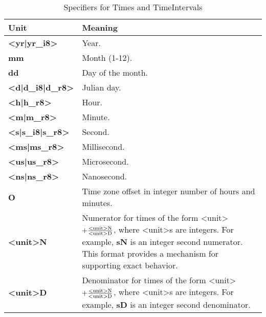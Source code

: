 \newpage
\begin{center}
\begin{table}
\caption{\label{table:timeOpts}Specifiers for Times and TimeIntervals}
\begin{tabular}{|p{1in}|p{3.5in}|}
\hline
Unit & Meaning \\
\hline\hline
{\bf <yr|yr\_i8>} & Year. \\
\hline
{\bf mm} & Month (1-12). \\
\hline
{\bf dd} & Day of the month. \\
\hline
{\bf <d|d\_i8|d\_r8>} & Julian day. \\
\hline
{\bf <h|h\_r8>} & Hour. \\
\hline
{\bf <m|m\_r8>} & Minute. \\
\hline
{\bf <s|s\_i8|s\_r8>} & Second. \\
\hline
{\bf <ms|ms\_r8>} & Millisecond. \\
\hline
{\bf <us|us\_r8>} & Microsecond. \\
\hline
{\bf <ns|ns\_r8>} & Nanosecond. \\
\hline
{\bf O} & Time zone offset in integer number of hours and minutes. \\
\hline
{\bf <unit>N} & Numerator for times of the form <unit> {\bf $ + 
\frac{{\rm <unit>N}}{{\rm <unit>D}}$}, where <unit>s are integers. For example, 
{\bf sN} is an integer second numerator.  This format provides 
a mechanism for supporting exact behavior. \\
\hline
{\bf <unit>D} & Denominator for times of the form <unit> {\bf $ + 
\frac{{\rm <unit>N}}{{\rm <unit>D}}$}, where <unit>s are integers. For example, 
{\bf sD} is an integer second denominator.
\\
\hline
\end{tabular}
\end{table}
\end{center}











